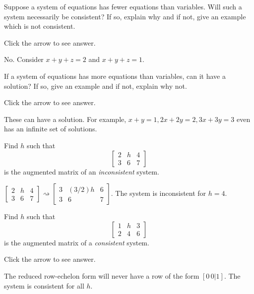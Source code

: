 \documentclass{ximera}
\begin{document}
\begin{problem}\label{prb:2.8}
Suppose a system of equations has fewer equations than variables. Will such a system necessarily be consistent? If so, explain why and if not, give an example which is not consistent.

Click the arrow to see answer.
\begin{expandable}
No. Consider $x+y+z=2$ and $x+y+z=1.$
\end{expandable}
\end{problem}

\begin{problem}\label{prb:2.9}
If a system of equations has more equations than variables, can it
have a solution? If so, give an example and if not, explain why not.

Click the arrow to see answer. 
\begin{expandable}
These can
have a solution. For example, $x+y=1,2x+2y=2,3x+3y=3$ even has an infinite
set of solutions.
\end{expandable}
\end{problem}

\begin{problem}\label{prb:2.10}
Find $h$ such that
\begin{equation*}
\left[
\begin{array}{rr|r}
2 & h & 4 \\
3 & 6 & 7
\end{array}
\right]
\end{equation*}
is the augmented matrix of an \textit{inconsistent} system.

\begin{expandable}
 $\left[
\begin{array}{cc|c}
2 & h & 4 \\
3 & 6 & 7
\end{array}
\right]\rightsquigarrow \left[
\begin{array}{cc|c}
3 & (3/2)h & 6 \\
3 & 6 & 7
\end{array}
\right]$.  The system is inconsistent for $h=4$.
\end{expandable}

\end{problem}

\begin{problem}\label{prb:2.11}
Find $h$ such that
\begin{equation*}
\left[
\begin{array}{rr|r}
1 & h & 3 \\
2 & 4 & 6
\end{array}
\right]
\end{equation*}
is the augmented matrix of a \textit{consistent} system.

Click the arrow to see answer. 
\begin{expandable}
 The reduced row-echelon form will never have a row of the form $[0\, 0|1]$. The system is consistent for all $h$.
\end{expandable}
\end{problem}
\end{document}
